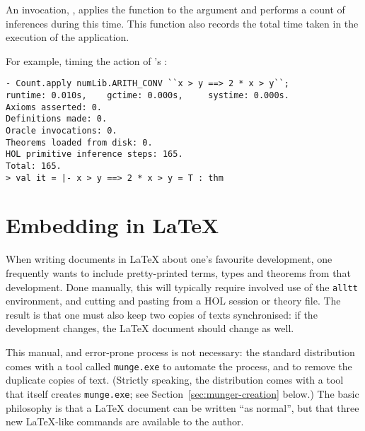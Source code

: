 An invocation, , applies the function  to
the argument  and performs a count of inferences during this
time.  This function also records the total time taken in the
execution of the application.

For example, timing the action of 's :

\setcounter{sessioncount}{1}
\begin{session}
\begin{verbatim}
- Count.apply numLib.ARITH_CONV ``x > y ==> 2 * x > y``;
runtime: 0.010s,    gctime: 0.000s,     systime: 0.000s.
Axioms asserted: 0.
Definitions made: 0.
Oracle invocations: 0.
Theorems loaded from disk: 0.
HOL primitive inference steps: 165.
Total: 165.
> val it = |- x > y ==> 2 * x > y = T : thm
\end{verbatim}
\end{session}



\section{Embedding \HOL{} in \LaTeX{}}

%
When writing documents in \LaTeX{} about one's favourite \HOL{} development, one frequently wants to include pretty-printed terms, types and theorems from that development.
%
Done manually, this will typically require involved use of the \texttt{alltt} environment, and cutting and pasting from a HOL session or theory file.
%
The result is that one must also keep two copies of \HOL{} texts synchronised: if the \HOL{} development changes, the \LaTeX{} document should change as well.

\newcommand{\munge}{\texttt{munge.exe}}
%
This manual, and error-prone process is not necessary: the standard \HOL{} distribution comes with a tool called \munge{} to automate the process, and to remove the duplicate copies of \HOL{} text.
%
(Strictly speaking, the distribution comes with a tool that itself creates \munge{}; see Section~\ref{sec:munger-creation} below.)
%
The basic philosophy is that a \LaTeX{} document can be written ``as normal'', but that three new \LaTeX{}-like commands are available to the author.

